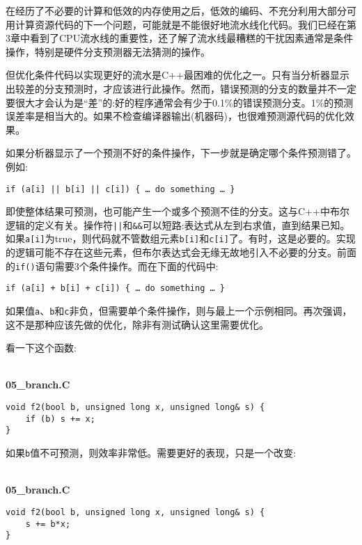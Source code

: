 在经历了不必要的计算和低效的内存使用之后，低效的编码、不充分利用大部分可用计算资源代码的下一个问题，可能就是不能很好地流水线化代码。我们已经在第3章中看到了CPU流水线的重要性，还了解了流水线最糟糕的干扰因素通常是条件操作，特别是硬件分支预测器无法猜测的操作。 

但优化条件代码以实现更好的流水是C++最困难的优化之一。只有当分析器显示出较差的分支预测时，才应该进行此操作。然而，错误预测的分支的数量并不一定要很大才会认为是“差”的:好的程序通常会有少于0.1\%的错误预测分支。1\%的预测误差率是相当大的。如果不检查编译器输出(机器码)，也很难预测源代码的优化效果。

如果分析器显示了一个预测不好的条件操作，下一步就是确定哪个条件预测错了。例如:

\begin{lstlisting}[style=styleCXX]
if (a[i] || b[i] || c[i]) { … do something … }
\end{lstlisting}

即使整体结果可预测，也可能产生一个或多个预测不佳的分支。这与C++中布尔逻辑的定义有关。操作符\texttt{||}和\texttt{\&\&}可以短路:表达式从左到右求值，直到结果已知。如果\texttt{a[i]}为true，则代码就不管数组元素\texttt{b[i]}和\texttt{c[i]}了。有时，这是必要的。实现的逻辑可能不存在这些元素，但布尔表达式会无缘无故地引入不必要的分支。前面的\texttt{if()}语句需要3个条件操作。而在下面的代码中:

\begin{lstlisting}[style=styleCXX]
if (a[i] + b[i] + c[i]) { … do something … }
\end{lstlisting}

如果值\texttt{a}、\texttt{b}和\texttt{c}非负，但需要单个条件操作，则与最上一个示例相同。再次强调，这不是那种应该先做的优化，除非有测试确认这里需要优化。

看一下这个函数:

\hspace*{\fill} \\ %
\noindent
\textbf{05\_branch.C}
\begin{lstlisting}[style=styleCXX]
void f2(bool b, unsigned long x, unsigned long& s) {
	if (b) s += x;
}
\end{lstlisting}

如果\texttt{b}值不可预测，则效率非常低。需要更好的表现，只是一个改变:

\hspace*{\fill} \\ %
\noindent
\textbf{05\_branch.C}
\begin{lstlisting}[style=styleCXX]
void f2(bool b, unsigned long x, unsigned long& s) {
	s += b*x;
}
\end{lstlisting}

